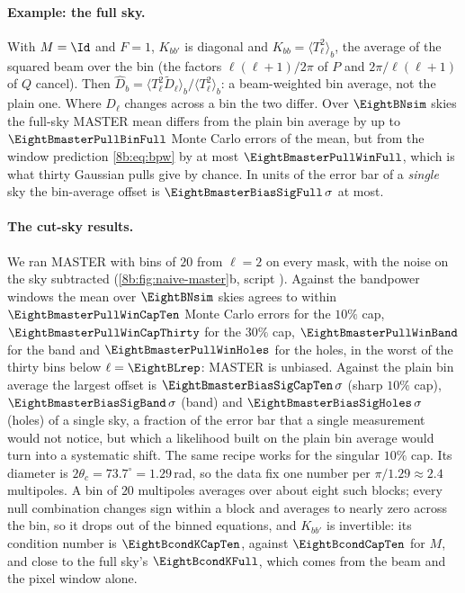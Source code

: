 \paragraph{Example: the full sky.}
With $M=\Id$ and $F=1$, $K_{bb'}$ is diagonal and $K_{bb}=\langle T^2_\ell\rangle_b$, the average of the squared
beam over the bin (the factors $\ell(\ell+1)/2\pi$ of $P$ and $2\pi/\ell(\ell+1)$ of $Q$ cancel). Then
$\widehat D_b=\langle T_\ell^2\widetilde D_\ell\rangle_b/\langle T_\ell^2\rangle_b$: a beam-weighted bin average, not the plain one. Where
$D_\ell$ changes across a bin the two differ. Over $\EightBNsim$ skies the full-sky MASTER mean differs from
the plain bin average by up to $\EightBmasterPullBinFull$ Monte Carlo errors of the mean, but from the
window prediction \eqref{8b:eq:bpw} by at most $\EightBmasterPullWinFull$, which is what thirty Gaussian pulls
give by chance. In units of the error bar of a \emph{single} sky the bin-average offset is
$\EightBmasterBiasSigFull\,\sigma$ at most.

\paragraph{The cut-sky results.}
We ran MASTER with bins of $20$ from $\ell=2$ on every mask, with the noise on the sky subtracted
(\cref{8b:fig:naive-master}b, script ). Against the bandpower windows the
mean over $\EightBNsim$ skies agrees to within $\EightBmasterPullWinCapTen$ Monte Carlo errors for the $10\%$ cap,
$\EightBmasterPullWinCapThirty$ for the $30\%$ cap, $\EightBmasterPullWinBand$ for the band and $\EightBmasterPullWinHoles$ for the holes,
in the worst of the thirty bins below $\ell=\EightBLrep$: MASTER is unbiased. Against the plain bin
average the largest offset is $\EightBmasterBiasSigCapTen\,\sigma$ (sharp $10\%$ cap), $\EightBmasterBiasSigBand\,\sigma$ (band) and
$\EightBmasterBiasSigHoles\,\sigma$ (holes) of a single sky, a fraction of the error bar that a single
measurement would not notice, but which a likelihood built on the plain bin average would turn
into a systematic shift. The same recipe works for the singular $10\%$ cap. Its diameter is
$2\theta_c=73.7^\circ=1.29$\,rad, so the data fix one number per $\pi/1.29\approx2.4$ multipoles. A bin of $20$
multipoles averages over about eight such blocks; every null combination changes sign within a block
and averages to nearly zero across the bin, so it drops out of the binned equations, and $K_{bb'}$ is
invertible: its condition number is $\EightBcondKCapTen$, against $\EightBcondCapTen$ for $M$, and close to the full sky's $\EightBcondKFull$, which comes from the beam and the pixel window alone.

